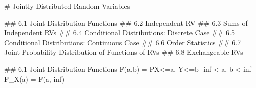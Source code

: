 # Jointly Distributed Random Variables

## 6.1 Joint Distribution Functions 
## 6.2 Independent RV
## 6.3 Sums of Independent RVs
## 6.4 Conditional Distributions: Discrete Case 
## 6.5 Conditional Distributions: Continuous Case 
## 6.6 Order Statistics
## 6.7 Joint Probability Distribution of Functions of RVs
## 6.8 Exchangeable RVs

## 6.1 Joint Distribution Functions 
F(a,b) = P{X<=a, Y<=b} -inf < a, b < inf
F_X(a) = F(a, inf)
